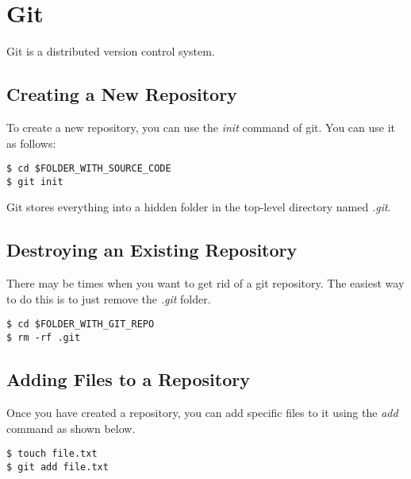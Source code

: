 \chapter{Git}

Git is a distributed version control system.

\section{Creating a New Repository}

To create a new repository, you can use the \emph{init} command of git. You 
can use it as follows:

\begin{lstlisting}[label=git-init, caption='Initializing a git repository']
$ cd $FOLDER_WITH_SOURCE_CODE
$ git init
\end{lstlisting}

Git stores everything into a hidden folder in the top-level directory
named \emph{.git}.

\section{Destroying an Existing Repository}

There may be times when you want to get rid of a git repository. The 
easiest way to do this is to just remove the \emph{.git} folder.

\begin{lstlisting}[label=git-destroy, caption='Destroying a git repository']
$ cd $FOLDER_WITH_GIT_REPO
$ rm -rf .git
\end{lstlisting}

\section{Adding Files to a Repository}

Once you have created a repository, you can add specific files to it 
using the \emph{add} command as shown below.

\begin{lstlisting}[label=git-add, caption='Adding files to a git repository']
$ touch file.txt
$ git add file.txt
\end{lstlisting}
